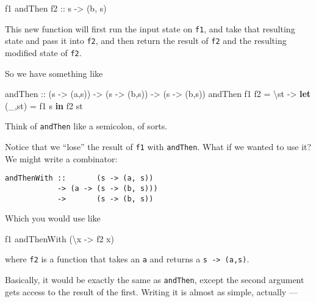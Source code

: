\documentclass[]{article}
\newenvironment{Shaded}{}{}
\newcommand{\KeywordTok}[1]{\textcolor[rgb]{0.00,0.44,0.13}{\textbf{#1}}}
\newcommand{\NormalTok}[1]{#1}
\newcommand{\OtherTok}[1]{\textcolor[rgb]{0.00,0.44,0.13}{#1}}
\begin{document}
\begin{Shaded}
\begin{Highlighting}[]
\NormalTok{f1 }\OtherTok{\textasciigrave{}andThen\textasciigrave{} f2 ::}\NormalTok{ s }\OtherTok{{-}>}\NormalTok{ (b, s)}
\end{Highlighting}
\end{Shaded}

This new function will first run the input state on \texttt{f1}, and take that
resulting state and pass it into \texttt{f2}, and then return the result of
\texttt{f2} and the resulting modified state of \texttt{f2}.

So we have something like

\begin{Shaded}
\begin{Highlighting}[]
\OtherTok{andThen ::}\NormalTok{ (s }\OtherTok{{-}>}\NormalTok{ (a,s)) }\OtherTok{{-}>}\NormalTok{ (s }\OtherTok{{-}>}\NormalTok{ (b,s)) }\OtherTok{{-}>}\NormalTok{ (s }\OtherTok{{-}>}\NormalTok{ (b,s))}
\NormalTok{andThen f1 f2 }\OtherTok{=}\NormalTok{ \textbackslash{}st }\OtherTok{{-}>} \KeywordTok{let}\NormalTok{ (\_,st\textquotesingle{}) }\OtherTok{=}\NormalTok{ f1 s}
                       \KeywordTok{in}\NormalTok{  f2 st\textquotesingle{}}
\end{Highlighting}
\end{Shaded}

Think of \texttt{andThen} like a semicolon, of sorts.

Notice that we ``lose'' the result of \texttt{f1} with \texttt{andThen}. What if
we wanted to use it? We might write a combinator:

\begin{verbatim}
andThenWith ::       (s -> (a, s))
            -> (a -> (s -> (b, s)))
            ->       (s -> (b, s))
\end{verbatim}

Which you would use like

\begin{Shaded}
\begin{Highlighting}[]
\NormalTok{f1 }\OtherTok{\textasciigrave{}andThenWith\textasciigrave{}}\NormalTok{ (\textbackslash{}x }\OtherTok{{-}>}\NormalTok{ f2 x)}
\end{Highlighting}
\end{Shaded}

where \texttt{f2} is a function that takes an \texttt{a} and returns a
\texttt{s\ -\textgreater{}\ (a,s)}.

Basically, it would be exactly the same as \texttt{andThen}, except the second
argument gets access to the result of the first. Writing it is almost as simple,
actually ---
\end{document}
